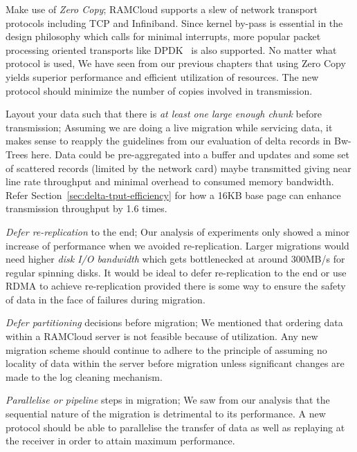 \begin{myitemize}
\item Make use of {\em Zero Copy}; RAMCloud supports a slew of network transport protocols including TCP and Infiniband. Since kernel by-pass is essential in the design philosophy which calls for minimal 
interrupts, more popular packet processing oriented transports like DPDK~\cite{dpdk} is also supported. No matter what protocol is used, We have seen from our previous chapters that 
using Zero Copy yields superior performance and efficient utilization of resources. The new protocol should minimize the number of copies involved in transmission.

\item Layout your data such that there is {\em at least one large enough chunk} before transmission; Assuming we are doing a live migration while servicing data, it makes sense to reapply the guidelines 
from our evaluation of delta records in Bw-Trees here. Data could be pre-aggregated into a buffer
 and updates and some set of scattered records (limited by the network card) maybe 
 transmitted giving near line rate throughput and minimal overhead to consumed 
 memory bandwidth. Refer Section~\ref{sec:delta-tput-efficiency} for how a 16KB 
 base page can enhance transmission throughput by 1.6 times.

\item {\em Defer re-replication} to the end; Our analysis of experiments only showed a minor increase of performance when we avoided re-replication. 
Larger migrations would need higher {\em disk I/O bandwidth} which gets bottlenecked at around 
300MB/s for regular spinning disks. It would be ideal to defer re-replication to the end or use RDMA to achieve re-replication 
provided there is some way to ensure the safety of data in the face of failures during migration.

\item {\em Defer partitioning} decisions before migration; We mentioned that ordering data within a RAMCloud server is not feasible because of utilization. Any new migration scheme should continue to adhere to the principle of assuming no locality 
of data within the server before migration unless significant changes are made to the log cleaning mechanism.

\item {\em Parallelise or pipeline} steps in migration; We saw from our analysis that the sequential nature of the migration is detrimental to its performance. A new protocol should be 
able to parallelise the transfer of data as well as replaying at the receiver in order to attain maximum performance. 

\end{myitemize}
\newpage




